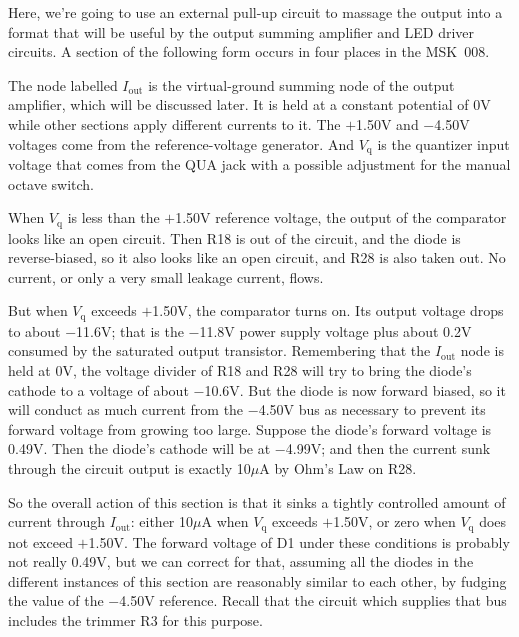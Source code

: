 Here, we're going to use an external pull-up circuit to massage the output
into a format that will be useful by the output summing amplifier and LED
driver circuits.  A section of the following form occurs in four places in
the MSK~008.

{\centering\par}

The node labelled $I_\textrm{out}$ is the virtual-ground summing node of the
output amplifier, which will be discussed later.  It is held at a constant
potential of 0V while other sections apply different currents to it.  The
$+$1.50V and $-$4.50V voltages come from the reference-voltage generator. 
And $V_\textrm{q}$ is the quantizer input voltage that comes from the QUA
jack with a possible adjustment for the manual octave switch.

When $V_\textrm{q}$ is less than the $+$1.50V reference voltage, the
output of the comparator looks like an open circuit.  Then R18 is out of the
circuit, and the diode is reverse-biased, so it also looks like an open
circuit, and R28 is also taken out.  No current, or only a very small
leakage current, flows.

But when $V_\textrm{q}$ exceeds $+$1.50V, the comparator turns on.  Its
output voltage drops to about $-$11.6V; that is the $-$11.8V power supply
voltage plus about 0.2V consumed by the saturated output transistor. 
Remembering that the $I_\textrm{out}$ node is held at 0V, the voltage
divider of R18 and R28 will try to bring the diode's cathode to a
voltage of about $-$10.6V.  But the diode is now forward biased, so it will
conduct as much current from the $-$4.50V bus as necessary to prevent its
forward voltage from growing too large.  Suppose the diode's forward voltage
is 0.49V.  Then the diode's cathode will be at $-$4.99V; and then the
current sunk through the circuit output is exactly 10$\mu$A by
Ohm's Law on R28.

So the overall action of this section is that it sinks a tightly controlled
amount of current through $I_\textrm{out}$: either 10$\mu$A when
$V_\textrm{q}$ exceeds $+$1.50V, or zero when $V_\textrm{q}$ does not exceed
$+$1.50V.  The forward voltage of D1 under these conditions is probably not
really 0.49V, but we can correct for that, assuming all the diodes in the
different instances of this section are reasonably similar to each other, by
fudging the value of the $-$4.50V reference.  Recall that the circuit which
supplies that bus includes the trimmer R3 for this purpose.


